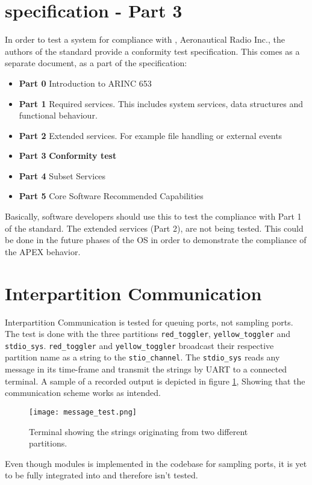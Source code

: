 \section{\arinc{} specification - Part 3}
In order to test a system for compliance with \arinc{}, Aeronautical
Radio Inc., the authors of the standard provide a conformity test
specification. This comes as a separate document, as a part of the
\arinc{} specification:
\begin{itemize}
	\item\textbf{Part 0} Introduction to ARINC 653
	\item\textbf{Part 1} Required services. This includes system services,
	data structures and functional behaviour.
	\item\textbf{Part 2} Extended services. For example file handling or external events
	\item\textbf{Part 3} \textbf{Conformity test}
	\item\textbf{Part 4} Subset Services
	\item\textbf{Part 5} Core Software Recommended Capabilities
\end{itemize}

Basically, software developers should use this to test the compliance with
Part 1 of the standard. The extended services (Part 2), are not being
tested. This could be done in the future phases of the \OSname{} OS in order
to demonstrate the compliance of the APEX behavior. 

\section{Interpartition Communication}
Interpartition Communication is tested for queuing ports, not sampling ports.
The test is done with the three partitions \texttt{red\_toggler},
\texttt{yellow\_toggler} and \texttt{stdio\_sys}. \texttt{red\_toggler} and
\texttt{yellow\_toggler} broadcast their respective partition name as a string
to the \texttt{stio\_channel}. The \texttt{stdio\_sys} reads any message in its
time-frame and transmit the strings by UART to a connected terminal. A sample of
a recorded output is depicted in figure \ref{fig:message_test}, Showing that the
communication scheme works as intended.

\begin{figure}[H]
	\centering
	\texttt{[image: message\_test.png]}
	\caption{Terminal showing the strings originating from two different
		partitions.}
	\label{fig:message_test}
\end{figure}

Even though modules is implemented in the codebase for sampling ports, it is yet
to be fully integrated into \OSname{} and therefore isn't tested.
